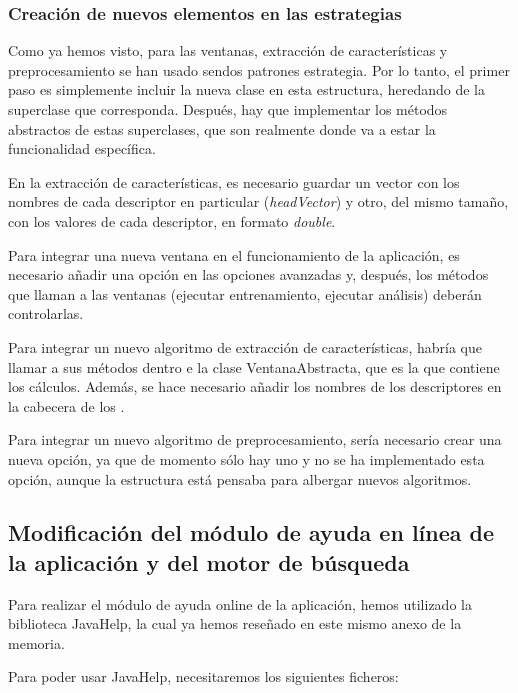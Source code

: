\subsubsection{Creación de nuevos elementos en las estrategias}
Como ya hemos visto, para las ventanas, extracción de características y preprocesamiento se han usado sendos patrones estrategia. Por lo tanto, el primer paso es simplemente incluir la nueva clase en esta estructura, heredando de la superclase que corresponda. Después, hay que implementar los métodos abstractos de estas superclases, que son realmente donde va a estar la funcionalidad específica.

En la extracción de características, es necesario guardar un vector con los nombres de cada descriptor en particular (\textit{headVector}) y otro, del mismo tamaño, con los valores de cada descriptor, en formato \textit{double}.

Para integrar una nueva ventana en el funcionamiento de la aplicación, es necesario añadir una opción en las opciones avanzadas y, después, los métodos que llaman a las ventanas (ejecutar entrenamiento, ejecutar análisis) deberán controlarlas.

Para integrar un nuevo algoritmo de extracción de características, habría que llamar a sus métodos dentro e la clase VentanaAbstracta, que es la que contiene los cálculos. Además, se hace necesario añadir los nombres de los descriptores en la cabecera de los \arff{}.

Para integrar un nuevo algoritmo de preprocesamiento, sería necesario crear una nueva opción, ya que de momento sólo hay uno y no se ha implementado esta opción, aunque la estructura está pensaba para albergar nuevos algoritmos.

\subsection{Modificación del módulo de ayuda en línea de la aplicación y del motor de búsqueda}
Para realizar el módulo de ayuda online de la aplicación, hemos utilizado la biblioteca JavaHelp, la cual ya hemos reseñado en este mismo anexo de la memoria.

Para poder usar JavaHelp, necesitaremos los siguientes ficheros:

